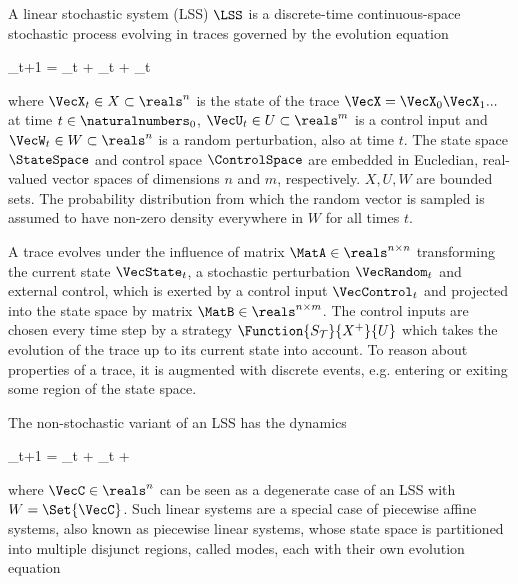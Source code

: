 \startsubsection[title={Linear Stochastic Systems},reference=sec:theory-hybrids-lss]

    A linear stochastic system (LSS) $\LSS$ is a discrete-time continuous-space stochastic process evolving in traces governed by the evolution equation

    \startformula
        \VecX_{t+1} = \MatA \VecX_t + \MatB \VecU_t + \VecW_t \EndComma
    \stopformula

    where $\VecX_t \in X \subset \reals^n$ is the state of the trace $\VecX = \VecX_0 \VecX_1 ...$ at time $t \in \naturalnumbers_0$,
    $\VecU_t \in U \subset \reals^m$ is a control input and
    $\VecW_t \in W \subset \reals^n$ is a random perturbation, also at time $t$.
    The state space $\StateSpace$ and control space $\ControlSpace$ are embedded in Eucledian, real-valued vector spaces of dimensions $n$ and $m$, respectively.
    $X, U, W$ are bounded sets.
    The probability distribution from which the random vector is sampled is assumed to have non-zero density everywhere in $W$ for all times $t$.

    A trace evolves under the influence of matrix $\MatA \in \reals^{n \times n}$ transforming the current state $\VecState_t$, a stochastic perturbation $\VecRandom_t$ and external control, which is exerted by a control input $\VecControl_t$ and projected into the state space by matrix $\MatB \in \reals^{n \times m}$.
    The control inputs are chosen every time step by a strategy $\Function{S_\mathcal{T}}{X^+}{U}$ which takes the evolution of the trace up to its current state into account. %
    To reason about properties of a trace, it is augmented with discrete events, e.g. entering or exiting some region of the state space.

\stopsubsection


\startsubsection[title={Related Systems}]

    The non-stochastic variant of an LSS has the dynamics

    \startformula
        \VecX_{t+1} = \MatA \VecX_t + \MatB \VecU_t + \VecC \EndComma
    \stopformula

    where $\VecC \in \reals^n$ can be seen as a degenerate case of an LSS with $W = \Set{\VecC}$.
    Such linear systems are a special case of piecewise affine systems, also known as piecewise linear systems, whose state space is partitioned into multiple disjunct regions, called modes, each with their own evolution equation

